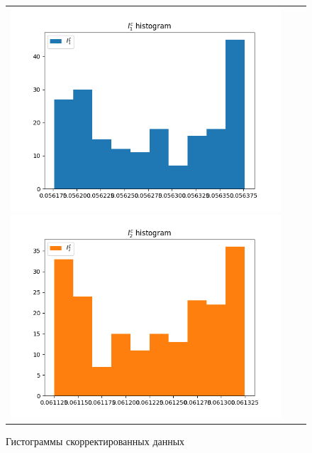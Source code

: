 \documentclass[../main.tex]{subfiles}
\begin{document}
\begin{figure}[H]
	\begin{tabular}{ccc}
		\includegraphics[scale=0.5]{figures/fhyst_PR1.png}
		\includegraphics[scale=0.5]{figures/fhyst_PR2.png}
	\end{tabular}
	\caption{Гистограммы скорректированных данных} 
\end{figure}
\end{document}
